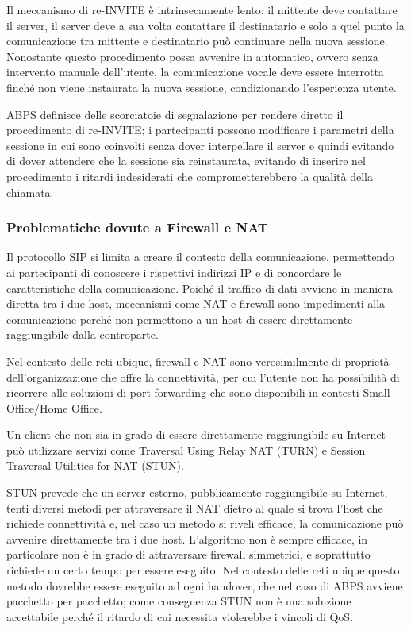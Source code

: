 \documentclass[12pt,a4paper,openright,twoside]{book}
\begin{document}
Il meccanismo di re-INVITE è intrinsecamente lento: il mittente deve
contattare il server, il server deve a sua volta contattare il
destinatario e solo a quel punto la comunicazione tra mittente e
destinatario può continuare nella nuova sessione. Nonostante questo
procedimento possa avvenire in automatico, ovvero senza intervento
manuale dell'utente, la comunicazione vocale deve essere interrotta
finché non viene instaurata la nuova sessione, condizionando
l'esperienza utente.

ABPS definisce delle scorciatoie di segnalazione per rendere diretto
il procedimento di re-INVITE; i partecipanti possono modificare i
parametri della sessione in cui sono coinvolti senza dover
interpellare il server e quindi evitando di dover attendere che la
sessione sia reinstaurata, evitando di inserire nel procedimento i
ritardi indesiderati che comprometterebbero la qualità della chiamata.

\subsubsection{Problematiche dovute a Firewall e NAT}

Il protocollo SIP si limita a creare il contesto della comunicazione,
permettendo ai partecipanti di conoscere i rispettivi indirizzi IP e
di concordare le caratteristiche della comunicazione. Poiché il
traffico di dati avviene in maniera diretta tra i due host, meccanismi
come NAT e firewall sono impedimenti alla comunicazione perché non
permettono a un host di essere direttamente raggiungibile dalla
controparte.

Nel contesto delle reti ubique, firewall e NAT sono verosimilmente di
proprietà dell'organizzazione che offre la connettività, per cui
l'utente non ha possibilità di ricorrere alle soluzioni di
port-forwarding che sono disponibili in contesti Small Office/Home
Office.

Un client che non sia in grado di essere direttamente raggiungibile su
Internet può utilizzare servizi come Traversal Using Relay NAT (TURN)
e Session Traversal Utilities for NAT (STUN).

STUN prevede che un server esterno, pubblicamente raggiungibile su
Internet, tenti diversi metodi per attraversare il NAT dietro al quale
si trova l'host che richiede connettività e, nel caso un metodo si
riveli efficace, la comunicazione può avvenire direttamente tra i due
host. L'algoritmo non è sempre efficace, in particolare non è in grado
di attraversare firewall simmetrici, e soprattutto richiede un certo
tempo per essere eseguito. Nel contesto delle reti ubique questo
metodo dovrebbe essere eseguito ad ogni handover, che nel caso di ABPS
avviene pacchetto per pacchetto; come conseguenza STUN non è una
soluzione accettabile perché il ritardo di cui necessita violerebbe i
vincoli di QoS.
\end{document}
